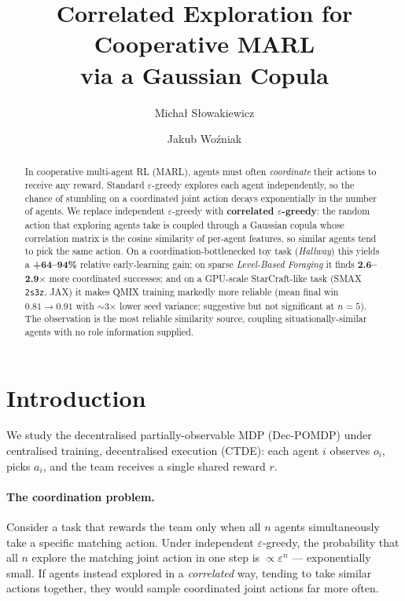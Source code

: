 \documentclass[10pt,twocolumn]{article}
\title{\vspace{-2em}\textbf{Correlated Exploration for Cooperative MARL\\via a Gaussian Copula}}
\author[]{Micha\l{} S\l owakiewicz \and Jakub Wo\'zniak}
\affil[]{Project 9 --- Reinforcement Learning}
\date{}
\newcommand{\eps}{\varepsilon}
\begin{document}
\maketitle

\begin{abstract}
\small
In cooperative multi-agent RL (MARL), agents must often \emph{coordinate} their
actions to receive any reward. Standard $\eps$-greedy explores each agent
independently, so the chance of stumbling on a coordinated joint action decays
exponentially in the number of agents. We replace independent $\eps$-greedy with
\textbf{correlated $\eps$-greedy}: the random action that exploring agents take
is coupled through a Gaussian copula whose correlation matrix is the cosine
similarity of per-agent features, so similar agents tend to pick the same action.
On a coordination-bottlenecked toy task (\emph{Hallway}) this yields a
\textbf{+64--94\%} relative early-learning gain; on sparse \emph{Level-Based
Foraging} it finds \textbf{2.6--2.9$\times$} more coordinated successes; and on a
GPU-scale StarCraft-like task (SMAX \texttt{2s3z}, JAX) it makes QMIX training
markedly more reliable (mean final win $0.81{\to}0.91$ with $\sim$3$\times$ lower
seed variance; suggestive but not significant at $n{=}5$). The observation is the
most reliable similarity source, coupling situationally-similar agents with no
role information supplied.
\end{abstract}

\section{Introduction}
We study the decentralised partially-observable MDP (Dec-POMDP) under centralised
training, decentralised execution (CTDE): each agent $i$ observes $o_i$, picks
$a_i$, and the team receives a single shared reward $r$.

\paragraph{The coordination problem.} Consider a task that rewards the team only
when all $n$ agents simultaneously take a specific matching action. Under
independent $\eps$-greedy, the probability that all $n$ explore the matching
joint action in one step is $\propto \eps^{n}$ --- exponentially small. If agents
instead explored in a \emph{correlated} way, tending to take similar actions
together, they would sample coordinated joint actions far more often.
\end{document}
